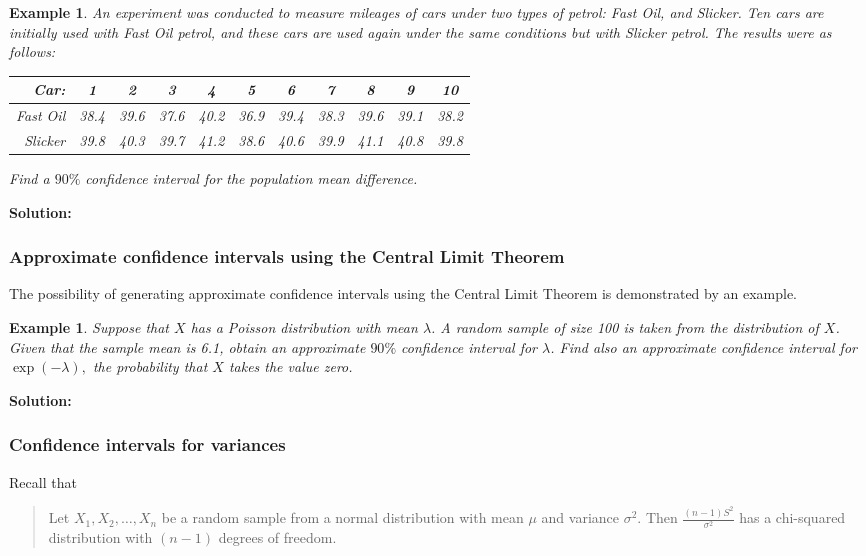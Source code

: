 \documentclass[12pt]{article}
\newtheorem{example}[theorem]{Example}
\begin{document}
\begin{example}
An experiment was conducted to measure mileages of cars under two types of petrol: Fast Oil, and Slicker. Ten cars are initially used with Fast Oil petrol, and these cars are used again under the same conditions but with Slicker petrol. The results were as follows:
\begin{center}
\begin{tabular}{|r|c|c|c|c|c|c|c|c|c|c|}
  \hline
  Car: & 1 & 2 & 3 & 4 & 5 & 6 & 7 & 8 & 9 & 10 \\ \hline
  Fast Oil & 38.4 & 39.6 & 37.6 & 40.2 & 36.9 & 39.4 & 38.3 & 39.6 & 39.1 & 38.2 \\
  Slicker  & 39.8 & 40.3 & 39.7 & 41.2 & 38.6 & 40.6 & 39.9 & 41.1 & 40.8 & 39.8 \\
  \hline
\end{tabular}
\end{center}
Find a $90\%$ confidence interval for the population mean difference.
\end{example}
\begin{mdframed}
{\bf Solution:}
\textcolor[rgb]{1.00,1.00,1.00}{\lipsum[1-4]}
\end{mdframed}

\subsubsection{Approximate confidence intervals using the Central Limit Theorem}
The possibility of generating approximate confidence intervals using the Central Limit Theorem is demonstrated by an example.
\begin{example}
Suppose that $X$ has a Poisson distribution with mean $\lambda$. A random sample of size 100 is taken from the distribution of $X$. Given that the sample mean is 6.1, obtain an approximate $90\%$ confidence interval for $\lambda$. Find also an approximate confidence interval for $\exp(-\lambda),$ the probability that $X$ takes the value zero.
\end{example}
\begin{mdframed}
{\bf Solution:}
\textcolor[rgb]{1.00,1.00,1.00}{\lipsum[1-3]}
\end{mdframed}

\subsubsection{Confidence intervals for variances}
Recall that
\begin{quote}
Let $X_{1},X_{2},\ldots,X_{n}$ be a random sample from a normal distribution with mean $\mu$ and variance $\sigma^2$. Then $\displaystyle \frac{(n-1)S^{2}}{\sigma^{2}}$ has a chi-squared distribution with $(n-1)$ degrees of freedom.
\end{quote}
\end{document}
